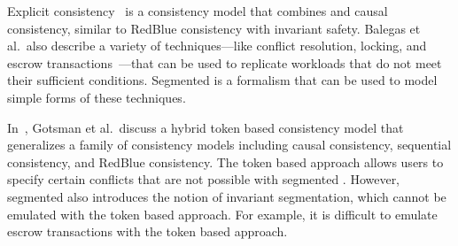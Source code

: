 Explicit consistency~\cite{balegas2015towards} is a consistency model that
combines \invariantconfluence{} and causal consistency, similar to RedBlue
consistency with invariant safety.
%
Balegas et al.\ also describe a variety of techniques---like conflict
resolution, locking, and escrow transactions~\cite{o1986escrow}---that can be
used to replicate workloads that do not meet their sufficient conditions.
Segmented \invariantconfluence{} is a formalism that can be
used to model simple forms of these techniques.

In~\cite{gotsman2016cause}, Gotsman et al.\ discuss a hybrid token based
consistency model that generalizes a family of consistency models including
causal consistency, sequential consistency, and RedBlue consistency.
The token based approach allows users to
specify certain conflicts that are not possible with segmented
\invariantconfluence{}.
However, segmented
\invariantconfluence{} also introduces the notion of invariant segmentation,
which cannot be emulated with the token based approach.
For example, it is
difficult to emulate escrow transactions with the token based approach.



